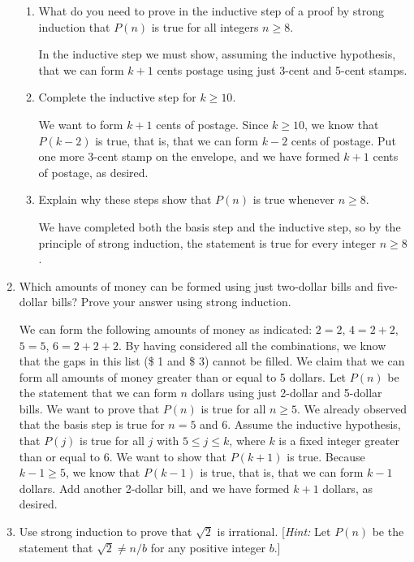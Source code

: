 \documentclass[11pt]{article}
\begin{document}
\begin{enumerate}[label=\textbf{\arabic*.}]
\begin{enumerate}[label=\textbf{\alph*)}]
		\item What do you need to prove in the inductive step of a proof by strong induction that $P(n)$ is true for all integers $n \geq 8$.
		
		In the inductive step we must show, assuming the inductive hypothesis, that we can form $k + 1$ cents postage using just 3-cent and 5-cent stamps.
		
		\item Complete the inductive step for $k \geq 10$.
		
		We want to form $k + 1$ cents of postage. Since $k \geq 10$, we know that $P(k - 2)$ is true, that is, that we can form $k - 2$ cents of postage. Put one more 3-cent stamp on the envelope, and we have formed $k + 1$ cents of postage, as desired.
		
		\item Explain why these steps show that $P(n)$ is true whenever $n \geq 8$.
		
		We have completed both the basis step and the inductive step, so by the principle of strong induction, the statement is true for every integer $n \geq 8$.
	\end{enumerate}

	\item Which amounts of money can be formed using just two-dollar bills and five-dollar bills? Prove your answer using strong induction.
	
	We can form the following amounts of money as indicated: $2 = 2$, $4 = 2 + 2$, $5 = 5$, $6 = 2 + 2 + 2$. By having considered all the combinations, we know that the gaps in this list (\$ 1 and \$ 3) cannot be filled. We claim that we can form all amounts of money greater than or equal to 5 dollars. Let $P(n)$ be the statement that we can form $n$ dollars using just 2-dollar and 5-dollar bills. We want to prove that $P(n)$ is true for all $n \geq 5$. We already observed that the basis step is true for $n = 5$ and 6. Assume the inductive hypothesis, that $P(j)$ is true for all $j$ with $5 \leq j \leq k$, where $k$ is a fixed integer greater than or equal to 6. We want to show that $P(k + 1)$ is true. Because $k - 1 \geq 5$, we know that $P(k - 1)$ is true, that is, that we can form $k - 1$ dollars. Add another 2-dollar bill, and we have formed $k + 1$ dollars, as desired.
	
	\item Use strong induction to prove that $\sqrt{2}$ is irrational. [\emph{Hint:} Let $P(n)$ be the statement that $\sqrt{2} \ne n / b$ for any positive integer $b$.]
	

\end{enumerate}
\end{document}

